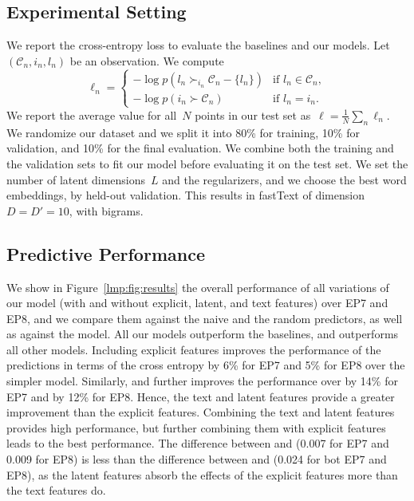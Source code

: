 \subsection{Experimental Setting}

We report the cross-entropy loss to evaluate the baselines and our models.
Let~$( \mathcal{C}_n, i_n, l_n )$ be an observation.
We compute
\begin{equation}
	\ell_n = \begin{cases}
		-\log p(l_n \succ_{i_n} \mathcal{C}_n - \{l_n\} ) & \text{if $l_n \in \mathcal{C}_n$}, \\
		-\log p(i_n \succ \mathcal{C}_n)                  & \text{if $l_n = i_n$}.
	\end{cases}
\end{equation}
We report the average value for all~$N$ points in our test set as~$\ell = \frac{1}{N} \sum_n \ell_n$.
We randomize our dataset and we split it into 80\% for training, 10\% for validation, and 10\% for the final evaluation.
We combine both the training and the validation sets to fit our model before evaluating it on the test set.
We set the number of latent dimensions~$L$ and the regularizers, and we choose the best word embeddings, by held-out validation.
This results in fastText of dimension~$D = D' = 10$, with bigrams.

\subsection{Predictive Performance}

We show in Figure~\ref{lmp:fig:results} the overall performance of all variations of our model (with and without explicit, latent, and text features) over EP7 and EP8, and we compare them against the naive and the random predictors, as well as against the \wow{} model.
All our models outperform the baselines, and  outperforms all other models.
Including explicit features improves the performance of the predictions in terms of the cross entropy by 6\% for EP7 and 5\% for EP8 over the simpler \wow{} model.
Similarly,  and  further improves the performance over \wow{} by 14\% for EP7 and by 12\% for EP8.
Hence, the text and latent features provide a greater improvement than the explicit features.
Combining the text and latent features provides high performance, but further combining them with explicit features leads to the best performance.
The difference between  and  (0.007 for EP7 and 0.009 for EP8) is less than the difference between  and  (0.024 for bot EP7 and EP8), as the latent features absorb the effects of the explicit features more than the text features do.


